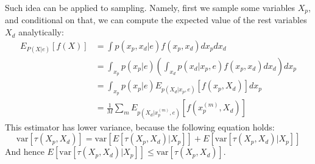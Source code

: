 \documentclass[twoside]{article}
\begin{document}
Such idea can be applied to sampling. Namely, first we sample some variables $X_p$, and conditional on that, we can compute the expected value of the rest variables $X_d$ analytically:
\begin{align*}
E_{P(X|e)}[f(X)] &= \int p(x_p,x_d|e)f(x_p,x_d)dx_pdx_d\\
&=\int_{x_p}p(x_p|e)\left(\int_{x_d}p(x_d|x_p,e)f(x_p,x_d)dx_d\right)dx_p\\
&=\int_{x_p}p(x_p|e)E_{p(X_d|x_p,e)}[f(x_p,X_d)]dx_p\\
&=\frac{1}{M}\sum_mE_{p(X_d|x_p^{(m)},e)}[f(x_p^{(m)},X_d)]
\end{align*}
This estimator has lower variance, because the following equation holds:
\[\text{var}[\tau(X_p,X_d)]=\text{var}[E[\tau(X_p,X_d)|X_p]]+E[\text{var}[\tau(X_p,X_d)|X_p]]\]
And hence $E[\text{var}[\tau(X_p,X_d)|X_p]]\leq\text{var}[\tau(X_p,X_d)]$.
\end{document}
